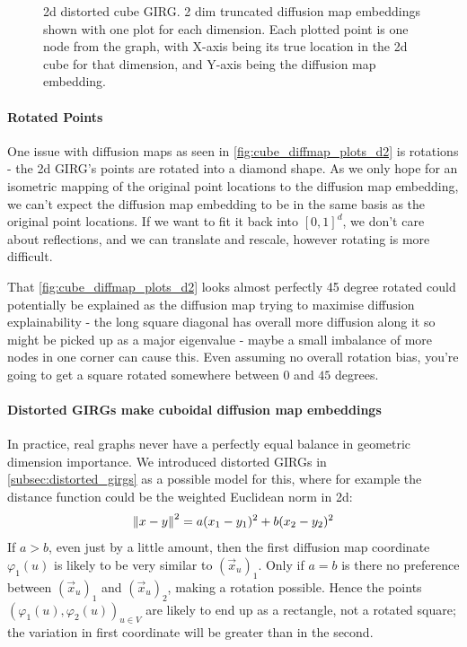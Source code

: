 \begin{figure}
  \caption{2d distorted cube GIRG. 2 dim truncated diffusion map embeddings shown with one plot for each dimension. Each plotted point is one node from the graph, with X-axis being its true location in the 2d cube for that dimension, and Y-axis being the diffusion map embedding.}
  \label{fig:2d_distorted_major_minor}
\end{figure}


\paragraph{Rotated Points} One issue with diffusion maps as seen in \cref{fig:cube_diffmap_plots_d2} is rotations - the 2d GIRG's points are rotated into a diamond shape. As we only hope for an isometric mapping of the original point locations to the diffusion map embedding, we can't expect the diffusion map embedding to be in the same basis as the original point locations. If we want to fit it back into $[0, 1]^d$, we don't care about reflections, and we can translate and rescale, however rotating is more difficult.

That \cref{fig:cube_diffmap_plots_d2} looks almost perfectly 45 degree rotated could potentially be explained as the diffusion map trying to maximise diffusion explainability - the long square diagonal has overall more diffusion along it so might be picked up as a major eigenvalue - maybe a small imbalance of more nodes in one corner can cause this. Even assuming no overall rotation bias, you're going to get a square rotated somewhere between $0$ and $45$ degrees.

\paragraph{Distorted GIRGs make cuboidal diffusion map embeddings} In practice, real graphs never have a perfectly equal balance in geometric dimension importance. 
We introduced distorted GIRGs in \cref{subsec:distorted_girgs} as a possible model for this, where for example the distance function could be the weighted Euclidean norm in 2d:
\begin{equation}\left\lVert x - y\right\rVert^2 = a (x_1 - y_1)^2 + b(x_2 - y_2)^2
\end{equation}
If $a > b$, even just by a little amount, then the first diffusion map coordinate $\varphi_1(u)$ is likely to be very similar to $(\vec{x}_u)_1$. Only if $a=b$ is there no preference between $(\vec{x}_u)_1$ and $(\vec{x}_u)_2$, making a rotation possible.
Hence the points $(\varphi_1(u), \varphi_2(u))_{u \in V}$ are likely to end up as a rectangle, not a rotated square; the variation in first coordinate will be greater than in the second.

